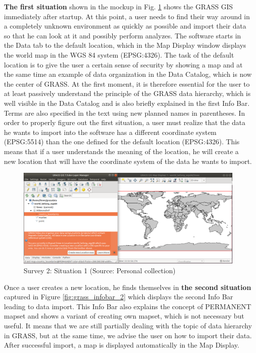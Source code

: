 \documentclass[a4paper,10pt,twoside]{article}
\begin{document}
\textbf{The first situation} shown in the mockup in Fig. \ref{fig:grass_infobar_1} shows the GRASS GIS immediately after startup. At this point, a user needs to find their way around in a completely unknown environment as quickly as possible and import their data so that he can look at it and possibly perform analyzes. The software starts in the Data tab to the default location, which in the Map Display window displays the world map in the WGS 84 system (EPSG:4326). The task of the default location is to give the user a certain sense of security by showing a map and at the same time an example of data organization in the Data Catalog, which is now the center of GRASS. At the first moment, it is therefore essential for the user to at least passively understand the principle of the GRASS data hierarchy, which is well visible in the Data Catalog and is also briefly explained in the first Info Bar. Terms are also specified in the text using new planned names in parentheses. In order to properly figure out the first situation, a user must realize that the data he wants to import into the software has a different coordinate system (EPSG:5514) than the one defined for the default location (EPSG:4326). This means that if a user understands the meaning of the location, he will create a new location that will have the coordinate system of the data he wants to import.

\vspace{0.3cm}
\begin{figure}[hbt!] 
\begin{center}
\includegraphics[width=17cm]{../pictures/grass_infobar_1.png} 
\caption[Survey 2: Situation 1]{Survey 2: Situation 1 (Source: Personal collection)}
\label{fig:grass_infobar_1}
\end{center}
\end{figure}

\newpage
\noindent Once a user creates a new location, he finds themselves in \textbf{the second situation} captured in Figure \ref{fig:grass_infobar_2} which displays the second Info Bar leading to data import. This Info Bar also explains the concept of PERMANENT mapset and shows a variant of creating own mapset, which is not necessary but useful. It means that we are still partially dealing with the topic of data hierarchy in GRASS, but at the same time, we advise the user on how to import their data. After successful import, a map is displayed automatically in the Map Display.
\end{document}
